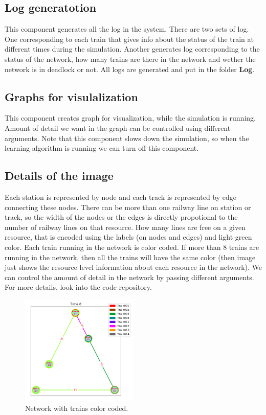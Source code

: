 \subsection{Log generatotion}
This component generates all the log in the system. There are two sets of log. One corresponding to each train that gives 
info about the status of the train at different times during the simulation. Another generates log corresponding 
to the status of the network, how many trains are there in the network and wether the network is in deadlock or not. All 
logs are generated and put in the folder \textbf{Log}.

\subsection{Graphs for visulalization}
This component creates graph for visualization, while the simulation is running. Amount of detail 
we want in the graph can be controlled using different arguments. Note that this component slows down the simulation,
so when the learning algorithm is running we can turn off this component.

\subsection{Details of the image} 
Each station is represented by node and each track is represented by edge
connecting these nodes. There can be more than one railway line on station or track, so the width of the 
nodes or the edges is directly propotional to the number of railway lines on that resource. How many lines 
are free on a given resource, that is encoded using the labels (on nodes and edges) and light green color. 
Each train running in the network is color coded. If more than 8 trains are running in the network, then all the trains
will have the same color (then image just shows the resource level information about each resource in the network).
We can control the amount of detail in the network by passing different arguments. For more details, look into the 
code repository. 


\begin{figure}[h]
    \centering
    \includegraphics[width=0.5\textwidth]{graph}
    \caption{ Network with trains color coded.  }
    \label{image-myimage5}
\end{figure}

